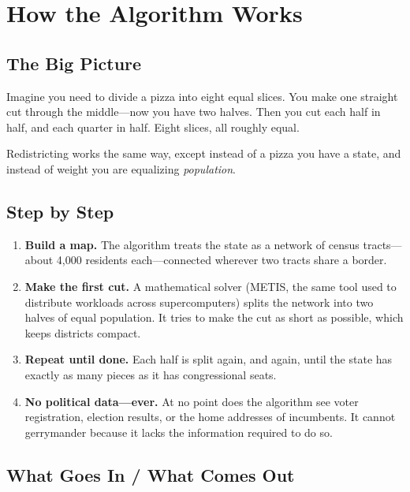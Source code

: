 
\section{How the Algorithm Works}

\subsection*{The Big Picture}

Imagine you need to divide a pizza into eight equal slices.
You make one straight cut through the middle---now you have two halves.
Then you cut each half in half, and each quarter in half.
Eight slices, all roughly equal.

Redistricting works the same way, except instead of a pizza you have
a state, and instead of weight you are equalizing \emph{population}.

\subsection*{Step by Step}

\begin{enumerate}
  \item \textbf{Build a map.}
    The algorithm treats the state as a network of census tracts---about
    4,000 residents each---connected wherever two tracts share a border.

  \item \textbf{Make the first cut.}
    A mathematical solver (METIS, the same tool used to distribute
    workloads across supercomputers) splits the network into two halves
    of equal population.  It tries to make the cut as short as possible,
    which keeps districts compact.

  \item \textbf{Repeat until done.}
    Each half is split again, and again, until the state has exactly as
    many pieces as it has congressional seats.

  \item \textbf{No political data---ever.}
    At no point does the algorithm see voter registration, election
    results, or the home addresses of incumbents.  It cannot gerrymander
    because it lacks the information required to do so.
\end{enumerate}

\subsection*{What Goes In / What Comes Out}

